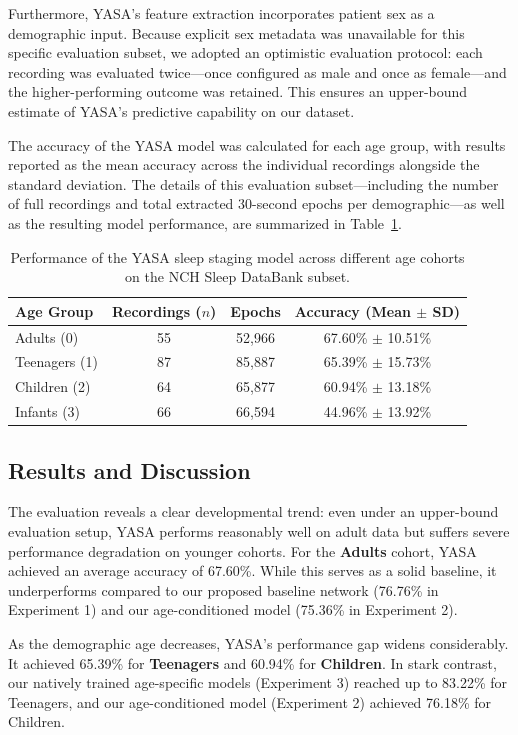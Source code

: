 Furthermore, YASA's feature extraction incorporates patient sex as a demographic input. Because explicit sex metadata was unavailable for this specific evaluation subset, we adopted an optimistic evaluation protocol: each recording was evaluated twice—once configured as male and once as female—and the higher-performing outcome was retained. This ensures an upper-bound estimate of YASA's predictive capability on our dataset.

The accuracy of the YASA model was calculated for each age group, with results reported as the mean accuracy across the individual recordings alongside the standard deviation. The details of this evaluation subset—including the number of full recordings and total extracted 30-second epochs per demographic—as well as the resulting model performance, are summarized in Table~\ref{tab:yasa_results}.

\begin{table}[ht]
\centering
\caption{Performance of the YASA sleep staging model across different age cohorts on the NCH Sleep DataBank subset.}
\label{tab:yasa_results}
\begin{tabular}{l c c c}
\toprule
\textbf{Age Group} & \textbf{Recordings ($n$)} & \textbf{Epochs} & \textbf{Accuracy (Mean $\pm$ SD)} \\
\midrule
Adults (0)   & 55 & 52,966 & 67.60\% $\pm$ 10.51\% \\
Teenagers (1)& 87 & 85,887 & 65.39\% $\pm$ 15.73\% \\
Children (2) & 64 & 65,877 & 60.94\% $\pm$ 13.18\% \\
Infants (3)  & 66 & 66,594 & 44.96\% $\pm$ 13.92\% \\
\bottomrule
\end{tabular}
\end{table}

\subsection{Results and Discussion}
The evaluation reveals a clear developmental trend: even under an upper-bound evaluation setup, YASA performs reasonably well on adult data but suffers severe performance degradation on younger cohorts. For the \textbf{Adults} cohort, YASA achieved an average accuracy of 67.60\%. While this serves as a solid baseline, it underperforms compared to our proposed baseline network (76.76\% in Experiment 1) and our age-conditioned model (75.36\% in Experiment 2). 

As the demographic age decreases, YASA's performance gap widens considerably. It achieved 65.39\% for \textbf{Teenagers} and 60.94\% for \textbf{Children}. In stark contrast, our natively trained age-specific models (Experiment 3) reached up to 83.22\% for Teenagers, and our age-conditioned model (Experiment 2) achieved 76.18\% for Children.

